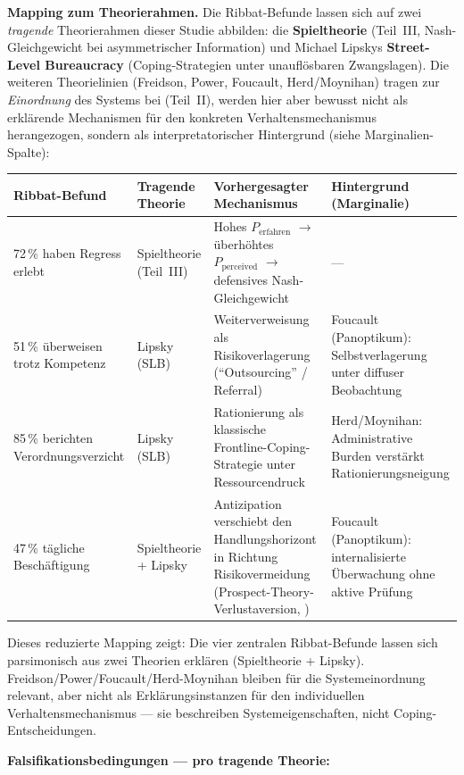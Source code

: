 \documentclass{umbruch-position}
\begin{document}
\textbf{Mapping zum Theorierahmen.} Die Ribbat-Befunde lassen sich auf zwei \emph{tragende} Theorierahmen dieser Studie abbilden: die \textbf{Spieltheorie} (Teil~III, Nash-Gleichgewicht bei asymmetrischer Information) und Michael Lipskys \textbf{Street-Level Bureaucracy} (Coping-Strategien unter unauflösbaren Zwangslagen). Die weiteren Theorielinien (Freidson, Power, Foucault, Herd/Moynihan) tragen zur \emph{Einordnung} des Systems bei (Teil~II), werden hier aber bewusst nicht als erklärende Mechanismen für den konkreten Verhaltensmechanismus herangezogen, sondern als interpretatorischer Hintergrund (siehe Marginalien-Spalte):

\begin{tabular}{p{3.8cm}p{3.2cm}p{3.8cm}p{2.7cm}}
\textbf{Ribbat-Befund} & \textbf{Tragende Theorie} & \textbf{Vorhergesagter Mechanismus} & \textbf{Hintergrund (Marginalie)} \\
\hline
72\,\% haben Regress erlebt & Spieltheorie (Teil~III) & Hohes $P_{\text{erfahren}}$ $\rightarrow$ überhöhtes $P_{\text{perceived}}$ $\rightarrow$ defensives Nash-Gleichgewicht & --- \\
51\,\% überweisen trotz Kompetenz & Lipsky (SLB) & Weiterverweisung als Risikoverlagerung (``Outsourcing'' / Referral) & Foucault (Panoptikum): Selbstverlagerung unter diffuser Beobachtung \\
85\,\% berichten Verordnungsverzicht & Lipsky (SLB) & Rationierung als klassische Frontline-Coping-Strategie unter Ressourcen\-druck & Herd/Moynihan: Administrative Burden verstärkt Rationierungs\-neigung \\
47\,\% tägliche Beschäftigung & Spieltheorie + Lipsky & Antizipation verschiebt den Handlungshorizont in Richtung Risikovermeidung (Prospect-Theory-Verlust\-aversion, \cite{kahneman_tversky1979}) & Foucault (Panoptikum): internalisierte Überwachung ohne aktive Prüfung \\
\end{tabular}

\vspace{0.3em}
\noindent Dieses reduzierte Mapping zeigt: Die vier zentralen Ribbat-Befunde lassen sich parsimonisch aus zwei Theorien erklären (Spieltheorie + Lipsky). Freidson/Power/Foucault/Herd-Moynihan bleiben für die Systemeinordnung relevant, aber nicht als Erklärungsinstanzen für den individuellen Verhaltensmechanismus --- sie beschreiben Systemeigenschaften, nicht Coping-Entscheidungen.

\medskip
\noindent\textbf{Falsifikationsbedingungen --- pro tragende Theorie:}
\end{document}

